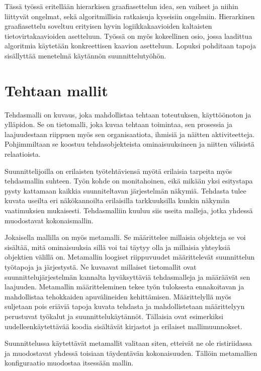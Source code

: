 \documentclass[finnish,12pt]{article}
\begin{document}
Tässä työssä eritellään hierarkisen graafiasettelun idea, sen vaiheet ja niihin liittyvät ongelmat, sekä algoritmillisia ratkaisuja kyseisiin ongelmiin.
Hierarkinen graafiasettelu soveltuu erityisen hyvin logiikkakaavioiden kaltaisten tietovirtakaavioiden asetteluun.
Työssä on myös kokeellinen osio, jossa laadittua algoritmia käytetään konkreettisen kaavion asetteluun.
Lopuksi pohditaan tapoja sisällyttää menetelmä käytännön suunnittelutyöhön.

	\clearpage
	\section{Tehtaan mallit}

Tehdasmalli on kuvaus, joka mahdollistaa tehtaan toteutuksen, käyttöönoton ja ylläpidon.
Se on tietomalli, joka kuvaa tehtaan toimintaa, sen prosessia ja laajuudestaan riippuen myös sen organisaatiota, ihmisiä ja näitten aktiviteetteja.
Pohjimmiltaan se koostuu tehdasobjekteista ominaisuuksineen ja niitten välisistä relaatioista. \cite{RefWorks:41}

Suunnittelijoilla on erilaisten työtehtäviensä myötä erilaisia tarpeita myös tehdasmallin suhteen.
Työn kohde on monitahoinen, eikä mikään yksi esitystapa pysty kattamaan kaikkia suunniteltavan järjestelmän näkymiä.
Tehdasta tulee kuvata useilta eri näkökannoilta erilaisilla tarkkuuksilla kunkin näkymän vaatimuksien mukaisesti.
Tehdasmalliin kuuluu siis useita malleja, jotka yhdessä muodostavat kokonaismallin.

Jokaisella mallilla on myös metamalli. Se määrittelee millaisia objekteja se voi sisältää, mitä ominaisuuksia sillä voi tai täytyy olla ja millaisia yhteyksiä objektien välillä on.
Metamallin loogiset riippuvuudet määrittelevät suunnittelun työtapoja ja järjestystä.
Ne kuvaavat millaiset tietomallit ovat suunnittelujärjestelmän kannalta hyväksyttäviä tehdasmalleja ja
määräävät sen laajuuden. Metamallin määritteleminen tekee työn tuloksesta ennakoitavan ja mahdollistaa tehokkaiden apuvälineiden kehittämisen.
Määrittelyllä myös suljetaan pois eriäviä tapoja kuvata tehdasta ja mahdollistetaan määrittelyyn perustuvat työkalut ja suunnittelukäytännöt.
Tällaisia ovat esimerkiksi uudelleenkäytettävää koodia sisältävät kirjastot ja erilaiset mallimuunnokset.

Suunnittelussa käytettävät metamallit valitaan siten, etteivät ne ole ristiriidassa ja muodostavat yhdessä toisiaan täydentävän kokonaisuuden.
Tällöin metamallien konfiguraatio muodostaa itsessään mallin.
\end{document}
